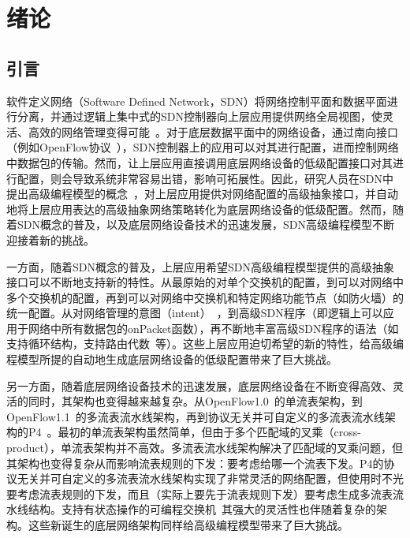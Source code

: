 \chapter{绪论}

\section{引言}

软件定义网络（Software Defined Network，SDN）将网络控制平面和数据平面进行分离，并通过逻辑上集中式的SDN控制器向上层应用提供网络全局视图，使灵活、高效的网络管理变得可能~\cite{mckeown2008openflow,feamster2013road,b4}。对于底层数据平面中的网络设备，通过南向接口（例如OpenFlow协议~\cite{mckeown2008openflow}），SDN控制器上的应用可以对其进行配置，进而控制网络中数据包的传输。然而，让上层应用直接调用底层网络设备的低级配置接口对其进行配置，则会导致系统非常容易出错，影响可拓展性。因此，研究人员在SDN中提出高级编程模型的概念~\cite{foster2011frenetic,maple,reich2013modular}，对上层应用提供对网络配置的高级抽象接口，并自动地将上层应用表达的高级抽象网络策略转化为底层网络设备的低级配置。然而，随着SDN概念的普及，以及底层网络设备技术的迅速发展，SDN高级编程模型不断迎接着新的挑战。

一方面，随着SDN概念的普及，上层应用希望SDN高级编程模型提供的高级抽象接口可以不断地支持新的特性。从最原始的对单个交换机的配置，到可以对网络中多个交换机的配置，再到可以对网络中交换机和特定网络功能节点（如防火墙）的统一配置。从对网络管理的意图（intent）~\cite{berde2014onos}，到高级SDN程序（即逻辑上可以应用于网络中所有数据包的onPacket函数），再不断地丰富高级SDN程序的语法（如支持循环结构，支持路由代数~\cite{gao2018t}等）。这些上层应用迫切希望的新的特性，给高级编程模型所提的自动地生成底层网络设备的低级配置带来了巨大挑战。

另一方面，随着底层网络设备技术的迅速发展，底层网络设备在不断变得高效、灵活的同时，其架构也变得越来越复杂。从OpenFlow1.0~\cite{openflow1}的单流表架构，到OpenFlow1.1~\cite{openflow1-1}的多流表流水线架构，再到协议无关并可自定义的多流表流水线架构的P4~\cite{P4}。最初的单流表架构虽然简单，但由于多个匹配域的叉乘（cross-product），单流表架构并不高效。多流表流水线架构解决了匹配域的叉乘问题，但其架构也变得复杂从而影响流表规则的下发：要考虑给哪一个流表下发。P4的协议无关并可自定义的多流表流水线架构实现了非常灵活的网络配置，但使用时不光要考虑流表规则的下发，而且（实际上要先于流表规则下发）要考虑生成多流表流水线结构。支持有状态操作的可编程交换机~\cite{moshref2014flow,bianchi2014openstate}其强大的灵活性也伴随着复杂的架构。这些新诞生的底层网络架构同样给高级编程模型带来了巨大挑战。

